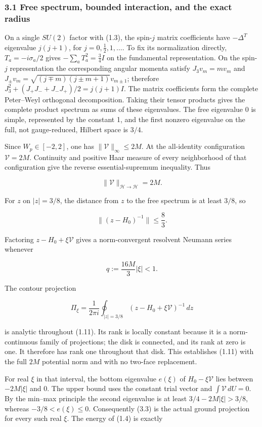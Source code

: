 \subsubsection{3.1 Free spectrum, bounded interaction, and the exact
radius}\label{bulk-free-spectrum-bounded-interaction-and-the-exact-radius}

On a single \(SU(2)\) factor with (1.3), the spin-\(j\) matrix
coefficients have \(-\Delta^T\) eigenvalue \(j(j+1)\), for
\(j=0,\tfrac12,1,\ldots\). To fix its normalization directly,
\(T_a=-i\sigma_a/2\) gives \(-\sum_aT_a^2=\tfrac34I\) on the fundamental
representation. On the spin-\(j\) representation the corresponding
angular momenta satisfy \(J_3v_m=mv_m\) and
\(J_\pm v_m=\sqrt{(j\mp m)(j\pm m+1)}v_{m\pm1}\); therefore
\(J_3^2+(J_+J_-+J_-J_+)/2=j(j+1)I\). The matrix coefficients form the
complete Peter--Weyl orthogonal decomposition. Taking their tensor
products gives the complete product spectrum as sums of these
eigenvalues. The free eigenvalue 0 is simple, represented by the
constant 1, and the first nonzero eigenvalue on the full, not
gauge-reduced, Hilbert space is \(3/4\).

Since \(W_p\in[-2,2]\), one has \(\|\mathcal V\|_\infty\leq2M\). At the
all-identity configuration \(\mathcal V=2M\). Continuity and positive
Haar measure of every neighborhood of that configuration give the
reverse essential-supremum inequality. Thus

\[
\|\mathcal V\|_{\mathcal H\to\mathcal H}=2M.
\tag{3.1}
\]

For \(z\) on \(|z|=3/8\), the distance from \(z\) to the free spectrum
is at least \(3/8\), so

\[
\|(z-H_0)^{-1}\|\leq\frac83.
\]

Factoring \(z-H_0+\xi\mathcal V\) gives a norm-convergent resolvent
Neumann series whenever

\[
q:=\frac{16M}{3}|\xi|<1.
\tag{3.2}
\]

The contour projection

\[
\Pi_\xi=\frac{1}{2\pi i}\oint_{|z|=3/8}
 (z-H_0+\xi\mathcal V)^{-1}\,dz
\tag{3.3}
\]

is analytic throughout (1.11). Its rank is locally constant because it
is a norm-continuous family of projections; the disk is connected, and
its rank at zero is one. It therefore has rank one throughout that disk.
This establishes (1.11) with the full \(2M\) potential norm and with no
two-face replacement.

For real \(\xi\) in that interval, the bottom eigenvalue \(e(\xi)\) of
\(H_0-\xi\mathcal V\) lies between \(-2M|\xi|\) and 0. The upper bound
uses the constant trial vector and \(\int\mathcal V\,dU=0\). By the
min--max principle the second eigenvalue is at least
\(3/4-2M|\xi|>3/8\), whereas \(-3/8<e(\xi)\leq0\). Consequently (3.3) is
the actual ground projection for every such real \(\xi\). The energy of
(1.4) is exactly

